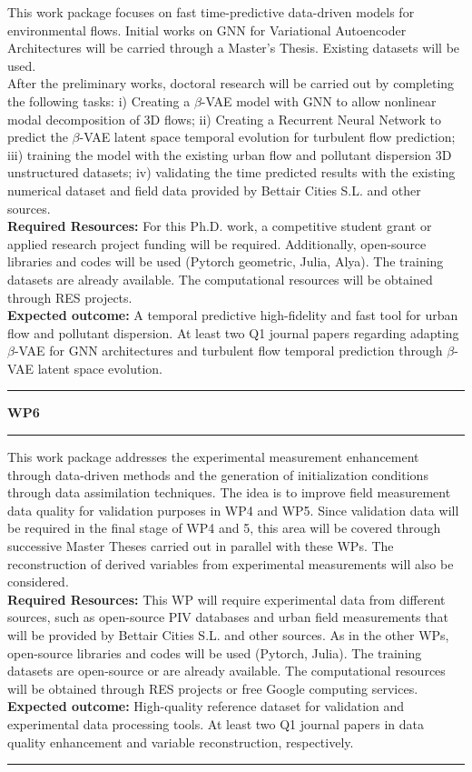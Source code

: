 \documentclass{article}
\begin{document}
This work package focuses on fast time-predictive data-driven models for environmental flows. Initial works on GNN for Variational Autoencoder Architectures will be carried through a Master's Thesis. Existing datasets will be used. \\
After the preliminary works, doctoral research will be carried out by completing the  following tasks: i) Creating a $\beta$-VAE model with GNN to allow nonlinear modal decomposition of 3D flows; ii) Creating a Recurrent Neural Network to predict the $\beta$-VAE latent space temporal evolution for turbulent flow prediction; iii) training the model with the existing urban flow and pollutant dispersion 3D unstructured datasets; iv) validating the time predicted results with the existing numerical dataset and field data provided by Bettair Cities S.L. and other sources.\\
{\bf Required Resources:} For this Ph.D. work, a competitive student grant or applied research project funding will be required. Additionally, open-source libraries and codes will be used (Pytorch geometric, Julia, Alya). The training datasets are already available. The computational resources will be obtained through RES projects. \\
{\bf Expected outcome:} A temporal predictive high-fidelity and fast tool for urban flow and pollutant dispersion. At least two Q1 journal papers regarding adapting $\beta$-VAE for GNN architectures and turbulent flow temporal prediction through $\beta$-VAE latent space evolution.
\vspace{4pt}
\hrule

\vspace{0.5cm}

{ \bf WP6 }
\vspace{4pt}
\hrule
This work package addresses the experimental measurement enhancement through data-driven methods and the generation of initialization conditions through data assimilation techniques. The idea is to improve field measurement data quality for validation purposes in WP4 and WP5. Since validation data will be required in the final stage of WP4 and 5, this area will be covered through successive Master Theses carried out in parallel with these WPs. The reconstruction of derived variables from experimental measurements will also be considered. \\
{\bf Required Resources:} This WP will require experimental data from different sources, such as open-source PIV databases and urban field measurements that will be provided by Bettair Cities S.L.  and other sources. As in the other WPs, open-source libraries and codes will be used (Pytorch, Julia). The training datasets are open-source or are already available. The computational resources will be obtained through RES projects or free Google computing services. \\
{\bf Expected outcome:} High-quality reference dataset for validation and experimental data processing tools. At least two Q1 journal papers in data quality enhancement and variable reconstruction, respectively.
\vspace{4pt}
\hrule
\end{document}
